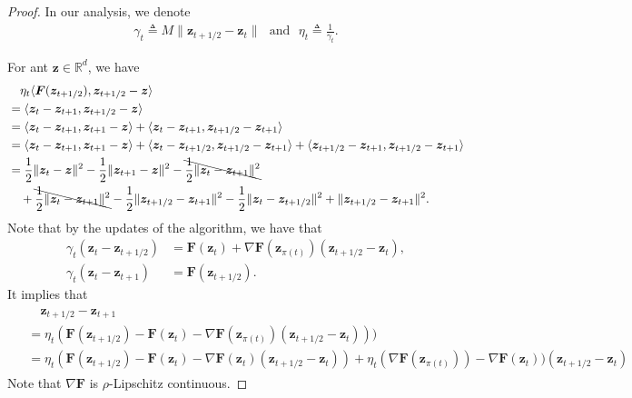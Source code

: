 \documentclass{article}
\def\vz{{\bm{z}}}
\def\mF{{\bm{F}}}
\def\sR{{\mathbb{R}}}
\theoremstyle{plain}
\begin{document}
\begin{proof}
In our analysis, we denote
\begin{align}
    \gamma_t \triangleq M\|\vz_{t+1/2}-\vz_t\|~~~\text{and}~~~\eta_t \triangleq \frac{1}{\gamma_t}.
\end{align}

    For ant $\vz \in \sR^{d}$,
     we have
    \begin{align} \label{eq:EG}
    \begin{split}
&\quad \eta_t \langle  \mF(\vz_{t+1/2}), \vz_{t+1/2} - \vz \rangle \\
& =  \langle \vz_t - \vz_{t+1}, \vz_{t+1/2} - \vz \rangle \\
&= \langle \vz_t - \vz_{t+1},  \vz_{t+1} - \vz \rangle +  \langle \vz_t - \vz_{t+1}, \vz_{t+1/2} - \vz_{t+1} \rangle \\
&=\langle \vz_t - \vz_{t+1}, \vz_{t+1} - \vz \rangle +  \langle \vz_t - \vz_{t+1/2}, \vz_{t+1/2} - \vz_{t+1} \rangle + \langle \vz_{t+1/2} - \vz_{t+1}, \vz_{t+1/2} - \vz_{t+1} \rangle \\
&= \frac{1}{2} \Vert \vz_{t} - \vz \Vert^2 - \frac{1}{2} \Vert \vz_{t+1} - \vz \Vert^2 - \bcancel{\frac{1}{2} \Vert \vz_t - \vz_{t+1} \Vert^2} \\
&\quad + \bcancel{\frac{1}{2} \Vert \vz_t - \vz_{t+1} \Vert^2}  -\frac{1}{2} \Vert \vz_{t+1/2} - \vz_{t+1} \Vert^2 - \frac{1}{2} \Vert \vz_t - \vz_{t+1/2} \Vert^2 + \Vert \vz_{t+1/2} - \vz_{t+1} \Vert^2.  
 \end{split}
    \end{align}
Note that by the updates of the algorithm, we have that
\begin{align*}
    \gamma_t (\vz_t - \vz_{t+1/2}) &= \mF(\vz_t) + \nabla \mF(\vz_{\pi(t)}) (\vz_{t+1/2} - \vz_t), \\
    \gamma_t(\vz_t - \vz_{t+1}) &= \mF(\vz_{t+1/2}).
\end{align*}
It implies that
\begin{align}
\begin{split} \label{eq:tt}
    &\quad \vz_{t+1/2} - \vz_{t+1} \\
    &= \eta_t (\mF(\vz_{t+1/2})  - \mF(\vz_t)- \nabla \mF(\vz_{\pi(t)}) (\vz_{t+1/2} - \vz_t))) \\
    &= \eta_t( \mF(\vz_{t+1/2})  - \mF(\vz_t)- \nabla \mF(\vz_{t}) (\vz_{t+1/2} - \vz_t)) + \eta_t (\nabla \mF(\vz_{\pi(t)})) - \nabla \mF(\vz_t)) (\vz_{t+1/2} - \vz_t)
\end{split}
\end{align}
Note that $\nabla \mF$ is $\rho$-Lipschitz continuous.

\end{proof}
\end{document}

